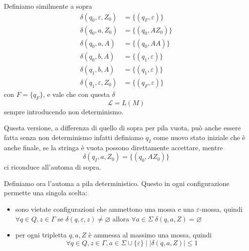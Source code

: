 \documentclass[12pt]{report}
\theoremstyle{definition}
\begin{document}
\begin{tcolorbox}
	Definiamo similmente a sopra
	\begin{align*}
		\delta(q_0, \varepsilon, Z_0) &= \{(q_F, \varepsilon)\} \\
		\delta(q_0, a, Z_0) &= \{(q_0, AZ_0)\} \\
		\delta(q_0, a, A)   &= \{(q_0, AA)\} \\
		\delta(q_0, b, A)   &= \{(q_1, \varepsilon)\} \\
		\delta(q_1, b, A)   &= \{(q_1, \varepsilon)\} \\
		\delta(q_1, \varepsilon, Z_0) &= \{(q_F, \varepsilon)\}
	\end{align*}
	con $F = \{q_F\}$, e vale che con questa $\delta$
	$$ \mathcal{L} = L(M) $$
	sempre introducendo non determinismo.
	
	Questa versione, a differenza di quello di sopra per pila vuota, può anche essere fatta senza non determinismo infatti definiamo $q_I$ come nuovo stato iniziale che è anche finale, se la stringa è vuota possono direttamente accettare, mentre 
	$$ \delta(q_I, a, Z_0) = \{(q_0, AZ_0)\} $$
	ci riconduce all'automa di sopra.
\end{tcolorbox}

Definiamo ora l'automa a pila deterministico.
Questo in ogni configurazione permette una singola scelta:
\begin{itemize}
	\item sono vietate configurazioni che ammettono una mossa e una $\varepsilon$-mossa, quindi $\forall q \in Q, z \in \Gamma$ se $\delta(q, \varepsilon, z) \neq \varnothing$ allora $\forall a \in \Sigma \; \delta(q, a, Z) = \varnothing$
	\item per ogni tripletta $q, a, Z$ è ammessa al massimo una mossa, quindi 
		$$\forall q \in Q, z \in \Gamma, a \in \Sigma \cup \{\varepsilon\} \mid |\delta(q, a, Z)|\leq 1$$
\end{itemize}
\end{document}
